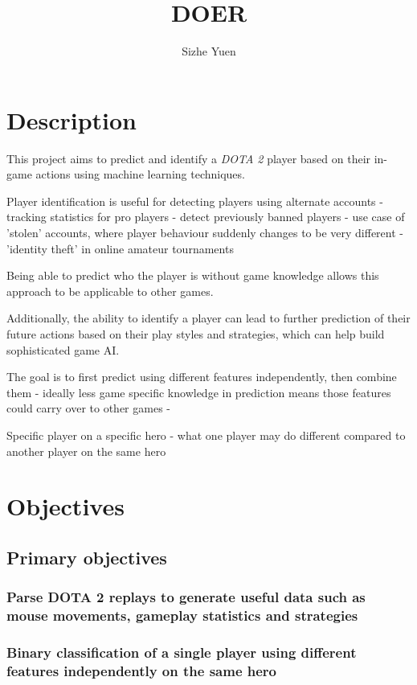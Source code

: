 \documentclass{sty/SizheArticle}
\title{DOER}
\author{Sizhe Yuen}
\begin{document}
\section{Description}
This project aims to predict and identify a \textit{DOTA 2} player based on their in-game actions using machine learning techniques.

Player identification is useful for detecting players using alternate accounts
- tracking statistics for pro players
- detect previously banned players
- use case of 'stolen' accounts, where player behaviour suddenly changes to be very different
- 'identity theft' in online amateur tournaments

Being able to predict who the player is without game knowledge allows this approach to be applicable to other games. 

Additionally, the ability to identify a player can lead to further prediction of their future actions based on their play styles and strategies, which can help build sophisticated game AI.

The goal is to first predict using different features independently, then combine them
- ideally less game specific knowledge in prediction means those features could carry over to other games
- 


Specific player on a specific hero
- what one player may do different compared to another player on the same hero






\section{Objectives}
\subsection{Primary objectives}

\subsubsection{Parse DOTA 2 replays to generate useful data such as mouse movements, gameplay statistics and strategies}

\subsubsection{Binary classification of a single player using different features independently on the same hero}
\end{document}
